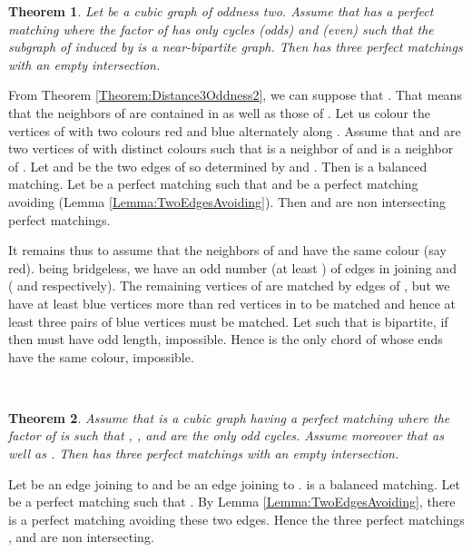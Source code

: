 \documentclass{elsart}
\theoremstyle{plain} \theoremheaderfont{\scshape}
\newtheorem{Thm}{\bf Theorem}
\newenvironment{Prf}{{\bf \noindent Proof } }{\hfill\\}
\begin{document}
\begin{Thm} \label{Theorem:3cyclesOddness2}Let  be a cubic graph of oddness two. Assume that 
has a perfect matching  where the factor  of
 has only  cycles  (odds) and  (even) such
that the subgraph of  induced by  is a near-bipartite graph.
Then  has three perfect matchings with an empty intersection.
\end{Thm}
\begin{Prf}
From Theorem \ref{Theorem:Distance3Oddness2}, we can suppose that
. That means that the neighbors of  are
contained in  as well as those of . Let us colour the
vertices of  with two colours red and blue alternately along
. Assume that  and  are two vertices of  with
distinct colours such that  is a neighbor of  and  is a
neighbor of . Let  and  be the two edges of  so
determined by  and . Then  is a balanced
matching. Let  be a perfect matching such that  and  be a perfect matching avoiding  (Lemma
\ref{Lemma:TwoEdgesAvoiding}). Then  and  are  non
intersecting perfect matchings.

It remains thus to assume that the neighbors of  and  have
the same colour (say red).  being bridgeless, we have an odd
number (at least ) of edges in  joining  and  (
and  respectively). The remaining vertices of  are matched
by edges of , but we have at least  blue vertices more than
red vertices in  to be matched and hence at least three pairs
of blue vertices must be matched. Let  such that 
is bipartite, if  then  must have odd length,
impossible. Hence  is the only chord of  whose ends have the
same colour, impossible.

\end{Prf}
\begin{Thm} \label{Theorem:Oddness4Distance1}
Assume that  is a cubic graph having a perfect matching  where
the factor  of 
is such that , ,  and  are the only odd cycles.
Assume moreover that  as well as . Then
 has three perfect matchings with an empty intersection.
\end{Thm}
\begin{Prf}
Let  be an edge joining  to  and  be an
edge joining  to .  is a balanced
matching. Let  be a perfect matching such that . By Lemma \ref{Lemma:TwoEdgesAvoiding}, there is a perfect
matching  avoiding these two edges. Hence the three perfect
matchings ,  and  are non intersecting.
\end{Prf}
\end{document}
